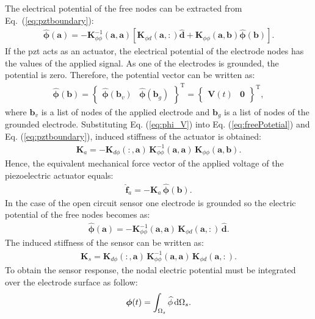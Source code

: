 The electrical potential of the free nodes can be extracted from Eq.~(\ref{eq:pztboundary}):
\begin{eqnarray}
	\widehat{\boldsymbol{\phi}}(\textbf{a}) = -\textbf{K}_{\phi\phi}^{-1}(\textbf{a},\textbf{a})\left[\textbf{K}_{\phi d}(\textbf{a},:) \widehat{\textbf{d}} + \textbf{K}_{\phi\phi}(\textbf{a},\textbf{b})\widehat{\boldsymbol{\phi}}(\textbf{b}) \right].
	\label{eq:freePotetial}
\end{eqnarray}
If the \ac{pzt} acts as an actuator, the electrical potential of the electrode nodes has the values of the applied signal.
As one of the electrodes is grounded, the potential is zero.
Therefore, the potential vector can be written as:
\begin{eqnarray}
	\widehat{\boldsymbol{\phi}}(\textbf{b}) = \left \{\begin{array}{cc}
		\widehat{\boldsymbol{\phi}}(\textbf{b}_v) &
		\widehat{\boldsymbol{\phi}}(\textbf{b}_g)
	\end{array}\right \}^{\mathrm{T}}=\left \{\begin{array}{cc}
	\textbf{V}(t) & \textbf{0}
	\end{array}\right \}^{\mathrm{T}},
	\label{eq:phi_V}
\end{eqnarray}
where \(\textbf{b}_v\) is a list of nodes of the applied electrode and \(\textbf{b}_g\) is a list of nodes of the grounded electrode.
Substituting Eq. (\ref{eq:phi_V}) into Eq. (\ref{eq:freePotetial}) and Eq. (\ref{eq:pztboundary}), induced stiffness of the actuator is obtained:
\begin{eqnarray}
	\textbf{K}_{a}=-\textbf{K}_{d\phi}(:,\textbf{a})\,\textbf{K}_{\phi \phi}^{-1}(\textbf{a},\textbf{a})\,\textbf{K}_{\phi \phi} (\textbf{a},\textbf{b}).
\end{eqnarray}
Hence, the equivalent mechanical force vector of the applied voltage of the piezoelectric actuator equals:
\begin{eqnarray}
	\widehat{\textbf{f}}_{a}=-\textbf{K}_{a}\,\widehat{\boldsymbol{\phi}}(\textbf{b}).
	\label{eq:f_act}
\end{eqnarray}
%
In the case of the open circuit sensor one electrode is grounded so the electric potential of the free nodes becomes as:
\begin{eqnarray}
	\widehat{\boldsymbol{\phi}}(\textbf{a}) = -\textbf{K}_{\phi\phi}^{-1}(\textbf{a},\textbf{a})\,\textbf{K}_{\phi d}(\textbf{a},:)\,\widehat{\textbf{d}}.
	\label{eq:sensorPotetial}
\end{eqnarray}
The induced stiffness of the sensor can be written as:
\begin{eqnarray} \textbf{K}_s=\textbf{K}_{d \phi}(:,\textbf{a})\,\textbf{K}_{\phi \phi}^{-1} (\textbf{a},\textbf{a})\,\textbf{K}_{\phi d}(\textbf{a},:).
\end{eqnarray}
To obtain the sensor response, the nodal electric potential must be integrated over the electrode surface as follow:
\begin{eqnarray}
	\boldsymbol{\phi}(t) = \int_{\Omega_s}\widehat{\phi} \mathop{}\!\mathrm{d}\Omega_s.
	\label{eq:sensorResponse}
\end{eqnarray}